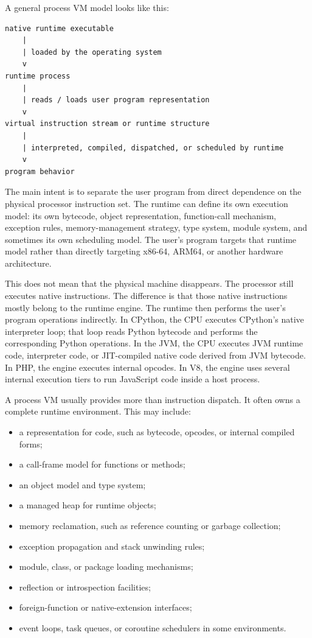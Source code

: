 \documentclass[a4paper,twoside]{report}
\begin{document}
A general process VM model looks like this:

\begin{verbatim}
native runtime executable
    |
    | loaded by the operating system
    v
runtime process
    |
    | reads / loads user program representation
    v
virtual instruction stream or runtime structure
    |
    | interpreted, compiled, dispatched, or scheduled by runtime
    v
program behavior
\end{verbatim}

The main intent is to separate the user program from direct dependence on the physical processor instruction set. The runtime can define its own execution model: its own bytecode, object representation, function-call mechanism, exception rules, memory-management strategy, type system, module system, and sometimes its own scheduling model. The user's program targets that runtime model rather than directly targeting x86-64, ARM64, or another hardware architecture.

This does not mean that the physical machine disappears. The processor still executes native instructions. The difference is that those native instructions mostly belong to the runtime engine. The runtime then performs the user's program operations indirectly. In CPython, the CPU executes CPython's native interpreter loop; that loop reads Python bytecode and performs the corresponding Python operations. In the JVM, the CPU executes JVM runtime code, interpreter code, or JIT-compiled native code derived from JVM bytecode. In PHP, the engine executes internal opcodes. In V8, the engine uses several internal execution tiers to run JavaScript code inside a host process.

A process VM usually provides more than instruction dispatch. It often owns a complete runtime environment. This may include:

\begin{itemize}
    \item a representation for code, such as bytecode, opcodes, or internal compiled forms;
    \item a call-frame model for functions or methods;
    \item an object model and type system;
    \item a managed heap for runtime objects;
    \item memory reclamation, such as reference counting or garbage collection;
    \item exception propagation and stack unwinding rules;
    \item module, class, or package loading mechanisms;
    \item reflection or introspection facilities;
    \item foreign-function or native-extension interfaces;
    \item event loops, task queues, or coroutine schedulers in some environments.
\end{itemize}
\end{document}
